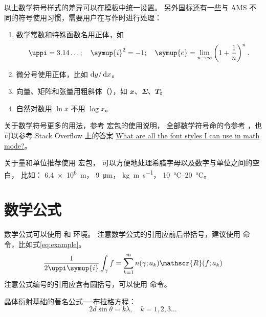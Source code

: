 以上数学符号样式的差异可以在模板中统一设置。
另外国标还有一些与 AMS 不同的符号使用习惯，需要用户在写作时进行处理：
\begin{enumerate}
  \item 数学常数和特殊函数名用正体，如
    \begin{equation*}
      \uppi = 3.14\dots; \quad
      \symup{i}^2 = -1; \quad
      \symup{e} = \lim_{n \to \infty} \left( 1 + \frac{1}{n} \right)^n.
    \end{equation*}
  \item 微分号使用正体，比如 $\mathop{}\!\mathrm{d} y / \mathop{}\!\mathrm{d} x$。
  \item 向量、矩阵和张量用粗斜体（），如 $\mathbfit{x}$、$\mathbfit{\Sigma}$、$\mathbfit{T}$。
  \item 自然对数用 $\ln x$ 不用 $\log x$。
\end{enumerate}



关于数学符号更多的用法，参考
\href{http://mirrors.ctan.org/macros/latex/contrib/unicode-math/unicode-math.pdf}{}
宏包的使用说明，
全部数学符号命的令参考
\href{http://mirrors.ctan.org/macros/latex/contrib/unicode-math/unimath-symbols.pdf}{}，也可以参考 Stack Overflow 上的答案 \href{https://tex.stackexchange.com/questions/58098/what-are-all-the-font-styles-i-can-use-in-math-mode}{What are all the font styles I can use in math mode?}。

关于量和单位推荐使用
\href{http://mirrors.ctan.org/macros/latex/contrib/siunitx/siunitx.pdf}{}
宏包，
可以方便地处理希腊字母以及数字与单位之间的空白，
比如：
\SI{6.4e6}{m}，
\SI{9}{\micro\meter}，
\si{kg.m.s^{-1}}，
\SIrange{10}{20}{\degreeCelsius}。



\section{数学公式}

数学公式可以使用  和  环境。
注意数学公式的引用应前后带括号，建议使用  命令，比如式\eqref{eq:example}。
\begin{equation}
  \frac{1}{2 \uppi \symup{i}} \int_\gamma f = \sum_{k=1}^m n(\gamma; a_k) \mathscr{R}(f; a_k)
  \label{eq:example}
\end{equation}
注意公式编号的引用应含有圆括号，可以使用  命令。

晶体衍射基础的著名公式──布拉格方程：
\begin{equation}
  2d\sin\theta=k\lambda, \quad k=1,2,3\ldots
\end{equation}

